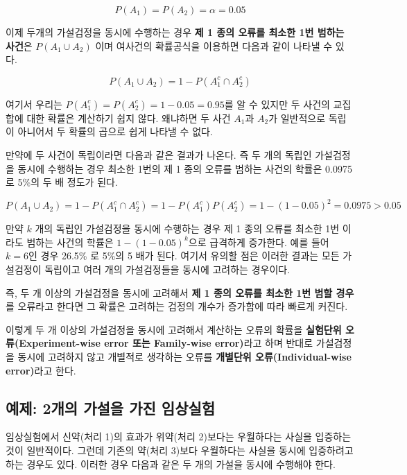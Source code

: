 \documentclass[
]{book}
\theoremstyle{definition}
\theoremstyle{definition}
\theoremstyle{definition}
\theoremstyle{definition}
\theoremstyle{remark}
\begin{document}
\[ P( A_1 ) =  P(A_2) = \alpha =0.05 \]

이제 두개의 가설검정을 동시에 수행하는 경우 \textbf{제 1 종의 오류를 최소한
1번 범하는 사건}은 \(P(A_1 \cup A_2)\) 이며 여사건의 확률공식을 이용하면
다음과 같이 나타낼 수 있다.

\[ P( A_1 \cup A_2 ) = 1- P(A_1^c \cap A^c_2 ) \]

여기서 우리는 \(P(A_1^c)=P(A_2^c)=1-0.05=0.95\)를 알 수 있지만 두 사건의
교집합에 대한 확률은 계산하기 쉽지 않다. 왜냐하면 두 사건 \(A_1\)과
\(A_2\)가 일반적으로 독립이 아니어서 두 확률의 곱으로 쉽게 나타낼 수 없다.

만약에 두 사건이 독립이라면 다음과 같은 결과가 나온다. 즉 두 개의 독립인
가설검정을 동시에 수행하는 경우 최소한 1번의 제 1 종의 오류를 범하는
사건의 학률은 0.0975로 5\%의 두 배 정도가 된다.

\[ P( A_1 \cup A_2 ) = 1- P(A_1^c \cap A^c_2 ) =1-P(A_1^c)P(A^c_2 ) = 1-(1-0.05)^2 = 0.0975 > 0.05 \]

만약 \(k\) 개의 독립인 가설검정을 동시에 수행하는 경우 제 1 종의 오류를
최소한 1번 이라도 범하는 사건의 학률은 \(1-(1-0.05)^k\)으로 급격하게
증가한다. 예를 들어 \(k=6\)인 경우 26.5\% 로 5\%의 5 배가 된다. 여기서
유의할 점은 이러한 결과는 모든 가설검정이 독립이고 여러 개의
가설검정들을 동시에 고려하는 경우이다.

즉, 두 개 이상의 가설검정을 동시에 고려해서 \textbf{제 1 종의 오류를 최소한
1번 범할 경우}를 오류라고 한다면 그 확률은 고려하는 검정의 개수가
증가함에 따라 빠르게 커진다.

이렇게 두 개 이상의 가설검정을 동시에 고려해서 계산하는 오류의 확률을
\textbf{실험단위 오류(Experiment-wise error 또는 Family-wise error)}라고 하며 반대로 가설검정을
동시에 고려하지 않고 개별적로 생각하는 오류를 \textbf{개별단위 오류(Individual-wise error)}라고 한다.

\hypertarget{uxc608uxc81c-2uxac1cuxc758-uxac00uxc124uxc744-uxac00uxc9c4-uxc784uxc0c1uxc2e4uxd5d8}{%
\subsection{예제: 2개의 가설을 가진 임상실험}\label{uxc608uxc81c-2uxac1cuxc758-uxac00uxc124uxc744-uxac00uxc9c4-uxc784uxc0c1uxc2e4uxd5d8}}

임상실험에서 신약(처리 1)의 효과가 위약(처리 2)보다는 우월하다는 사실을
입증하는 것이 일반적이다. 그런데 기존의 약(처리 3)보다 우월하다는 사실을
동시에 입증하려고 하는 경우도 있다. 이러한 경우 다음과 같은 두 개의
가설을 동시에 수행해야 한다.
\end{document}

